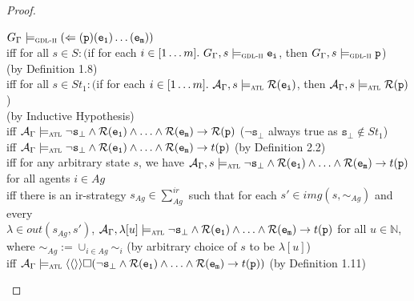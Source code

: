 \documentclass{article}
\theoremstyle{theorem}
\theoremstyle{lemma}
\theoremstyle{definition}
\theoremstyle{remark}
\begin{document}
\begin{proof}
\begin{tabbing}
    \> $G_\Gamma \models_\textsc{gdl-ii} (\Leftarrow(\texttt{p}) (\texttt{e\textsubscript{1}}) \ldots(\texttt{e\textsubscript{m}}))$ \\
    \>\> iff for all $s \in S:($if for each $i \in [1\ldots m].\ G_\Gamma, s \models_\textsc{gdl-ii} \texttt{e\textsubscript{i}}$, then $G_\Gamma,s \models_\textsc{gdl-ii} \texttt{p}$) \\
    \>\>\> (by Definition 1.8) \\
    \>\> iff for all $s \in St_1:($if for each $i \in [1\ldots m].\ \mathcal{A}_\Gamma, s \models_\textsc{atl} \mathcal{R} (\texttt{e\textsubscript{i}})$, then $\mathcal{A}_\Gamma, s \models_\textsc{atl} \mathcal{R}(\texttt{p})$) \\
    \>\>\> (by Inductive Hypothesis) \\
    \>\> iff $\mathcal{A}_\Gamma \models_\textsc{atl} \neg \texttt{s}_\bot \wedge \mathcal{R}(\texttt{e}_\texttt{1}) \wedge \ldots \wedge \mathcal{R}(\texttt{e}_\texttt{m}) \rightarrow \mathcal{R}(\texttt{p})$ ($ \neg \texttt{s}_\bot$ always true as $\texttt{s}_\bot \not \in St_1$) \\
    \>\> iff $\mathcal{A}_\Gamma \models_\textsc{atl} \neg \texttt{s}_\bot \wedge \mathcal{R}(\texttt{e}_\texttt{1}) \wedge \ldots \wedge \mathcal{R}(\texttt{e}_\texttt{m}) \rightarrow t(\texttt{p})$ (by Definition 2.2) \\
    \>\> iff for any arbitrary state $s$, we have $\mathcal{A}_\Gamma, s \models_\textsc{atl} \neg \texttt{s}_\bot \wedge \mathcal{R}(\texttt{e}_\texttt{1}) \wedge \ldots \wedge \mathcal{R}(\texttt{e}_\texttt{m}) \rightarrow t(\texttt{p})$ \\
    \>\>\> for all agents $i \in Ag$ \\
    \>\> iff there is an ir-strategy $s_{Ag} \in \sum_{Ag}^{ir}$ such that for each $s' \in img(s, \sim_{Ag})$ and every \\
    \>\>\> $\lambda \in out(s_{Ag}, s')$, $\mathcal{A}_\Gamma, \lambda[u] \models_\textsc{atl}\neg \texttt{s}_\bot \wedge \mathcal{R}(\texttt{e}_\texttt{1}) \wedge \ldots \wedge \mathcal{R}(\texttt{e}_\texttt{m}) \rightarrow t(\texttt{p})$ for all $u \in \mathbb{N}$, \\
    \>\>\> where $\sim_{Ag}:= \cup_{i \in Ag} \sim_i$ (by arbitrary choice of $s$ to be $\lambda[u]$)\\
    \>\> iff $\mathcal{A}_\Gamma \models_\textsc{atl} \langle \langle \rangle \rangle \square (\neg \texttt{s}_\bot \wedge \mathcal{R}(\texttt{e}_\texttt{1}) \wedge \ldots \wedge \mathcal{R}(\texttt{e}_\texttt{m}) \rightarrow t(\texttt{p}))$ (by Definition 1.11) \\

\end{tabbing}
\end{proof}
\end{document}
